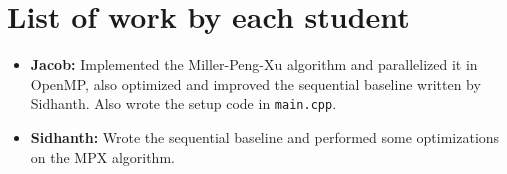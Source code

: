\documentclass[11pt]{scrartcl}
\theoremstyle{plain}
\theoremstyle{definition}
\theoremstyle{remark}
\begin{document}
\section{List of work by each student}
\begin{itemize}

\item \textbf{Jacob:} Implemented the Miller-Peng-Xu
algorithm and parallelized it in OpenMP, also optimized
and improved the sequential baseline written by Sidhanth.
Also wrote the setup code in \texttt{main.cpp}.

\item \textbf{Sidhanth:} Wrote the sequential baseline and
performed some optimizations on the MPX algorithm.

\end{itemize}



\end{document}
